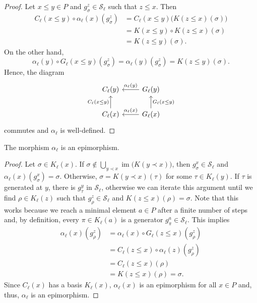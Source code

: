 \documentclass[english,a4paper,nolineno,cleveref]{socg-lipics-v2021}
\DeclareMathOperator{\im}{im}
\begin{document}
\begin{proof}
Let $x\leq y\in P$ and $g^z_\sigma\in \mathcal{S}_\ell$ such that $z\leq x$. Then 
\begin{equation*}
\begin{aligned}
C_\ell(x\leq y)\circ \alpha_\ell(x)(g^z_\sigma)&=C_\ell(x\leq y)\big(K(z\leq x)(\sigma)\big) \\
&=K(x\leq y)\circ K(z\leq x)(\sigma)\\&=K(z\leq y)(\sigma).    
\end{aligned}
\end{equation*}
On the other hand, 
\begin{equation*}
\alpha_\ell(y)\circ G_\ell(x\leq y)(g^z_\sigma)=\alpha_\ell(y)(g^z_\sigma)=K(z\leq y)(\sigma).    
\end{equation*}
Hence, the diagram
\begin{equation*}
\begin{tikzcd}
C_\ell(y) & G_\ell(y) \arrow[l,swap,"\alpha_\ell(y)"] \\
C_\ell(x) \arrow[u,"C_\ell(x\leq y)"] & G_\ell(x)  \arrow[l,swap,"\alpha_\ell(x)"] \arrow[u,swap,"G_\ell(x\leq y)"]
\end{tikzcd}
\end{equation*}
commutes and $\alpha_\ell$ is well-defined.    
\end{proof}


\begin{proposition} \label{prop:alpha_epi}
The morphism $\alpha_\ell$ is an epimorphism.
\end{proposition}

\begin{proof}
Let $\sigma\in K_\ell(x)$. If $\sigma\notin \bigcup_{y\prec x}\im\!\big( K(y\prec x)\big)$, then $g^x_\sigma\in\mathcal{S}_\ell$ and $\alpha_\ell(x)(g^x_\sigma)=\sigma$. Otherwise, $\sigma=K(y\prec x)(\tau)$ for some $\tau\in K_\ell(y)$. If $\tau$ is generated at $y$, there is $g^y_\tau$ in $\mathcal{S}_\ell$, otherwise we can iterate this argument until we find $\rho\in K_\ell(z)$ such that $g^z_\rho\in\mathcal{S}_\ell$ and $K(z\leq x)(\rho)=\sigma$. Note that this works because we reach a minimal element $a\in P$ after a finite number of steps and, by definition, every $\pi\in K_\ell(a)$ is a generator $g^a_\pi\in \mathcal{S}_\ell$. This implies
\begin{equation*}
\begin{aligned}
\alpha_\ell(x)(g^z_\rho)&=\alpha_\ell(x)\circ G_\ell(z\leq x)(g^z_\rho)\\&=C_\ell(z\leq x)\circ \alpha_\ell(z)(g^z_\rho) \\ &=C_\ell(z\leq x)(\rho)\\&=K(z\leq x)(\rho)=\sigma .
\end{aligned}    
\end{equation*}
Since $C_\ell(x)$ has a basis $K_\ell(x)$, $\alpha_\ell(x)$ is an epimorphism for all $x\in P$ and, thus, $\alpha_\ell$ is an epimorphism.    
\end{proof}
\end{document}
